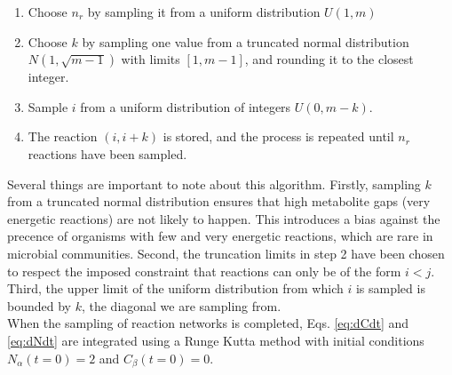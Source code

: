 \documentclass[titlepage,11pt]{article}
\begin{document}
\begin{linenumbers}
\begin{singlespace}
\begin{enumerate}
					\item Choose $ n_{r} $ by sampling it from a uniform distribution $ U \left(1, {m}\right) $
					\item \sloppy Choose $ k $  by sampling one value from a truncated normal distribution $N\left(1,  \sqrt {m - 1}\right)$ with limits $ [1, m-1] $, and rounding it to the closest integer.
					\item Sample $ i $ from a uniform distribution of integers $ U(0, m-k) $.
					\item The reaction $ (i, i + k) $ is stored, and the process is repeated until $ n_{r} $ reactions have been sampled.
				\end{enumerate}
				Several things are important to note about this algorithm. Firstly, sampling $ k $ from a truncated normal distribution ensures that high metabolite gaps (very energetic reactions) are not likely to happen. This introduces a bias against the precence of organisms with few and very energetic reactions, which are rare in microbial communities. Second, the truncation limits in step 2 have been chosen to respect the imposed constraint that reactions can only be of the form $ i < j $. Third, the upper limit of the uniform distribution from which $ i $ is sampled is bounded by $ k $, the diagonal we are sampling from. \\
				When the sampling of reaction networks is completed, Eqs. \ref{eq:dCdt} and \ref{eq:dNdt} are integrated using a Runge Kutta method \citep{Dormand1980} with initial conditions $ N_{\alpha}(t = 0) = 2 $ and $ C_{\beta}(t = 0) = 0 $. \\

			

\end{singlespace}
\end{linenumbers}
\end{document}
